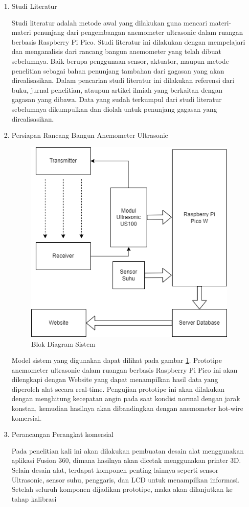 \begin{enumerate}
  \item Studi Literatur
  
  Studi literatur adalah metode awal yang dilakukan guna mencari materi-materi penunjang dari pengembangan anemometer ultrasonic 
  dalam ruangan berbasis Raspberry Pi Pico. Studi literatur ini dilakukan dengan mempelajari dan menganalisis dari rancang bangun 
  anemometer yang telah dibuat sebelumnya. Baik berupa penggunaan sensor, aktuator, maupun metode penelitian sebagai bahan penunjang 
  tambahan dari gagasan yang akan direalisasikan. Dalam pencarian studi literatur ini dilakukan referensi dari buku, jurnal penelitian, 
  ataupun artikel ilmiah yang berkaitan dengan gagasan yang dibawa. Data yang sudah terkumpul dari studi literatur sebelumnya dikumpulkan
  dan diolah untuk penunjang gagasan yang direalisasikan.

  \item Persiapan Rancang Bangun Anemometer Ultrasonic

  \begin{figure}[h!]
    \centering
    \includegraphics[width=0.4\linewidth]{"gambar/Blok diagram anemometer ultrasonic"}
    \caption{Blok Diagram Sistem}
    \label{fig:blok-diagram-anemometer-ultrasonic}
  \end{figure}

  Model sistem yang digunakan dapat dilihat pada  gambar \ref{fig:blok-diagram-anemometer-ultrasonic}. Prototipe anemometer ultrasonic dalam ruangan berbasis 
  Raspberry Pi Pico ini akan dilengkapi dengan Website yang dapat menampilkan hasil data yang diperoleh alat secara real-time. Pengujian prototipe ini akan dilakukan 
  dengan menghitung kecepatan angin pada saat kondisi normal dengan jarak konstan, kemudian hasilnya akan dibandingkan dengan anemometer hot-wire komersial. 

  \item Perancangan Perangkat komersial
  
  Pada penelitian kali ini akan dilakukan pembuatan desain alat menggunakan aplikasi Fusion 360, dimana hasilnya akan dicetak menggunakan printer 3D. Selain desain alat, terdapat komponen
  penting lainnya seperti sensor Ultrasonic, sensor suhu, penggaris, dan LCD untuk menampilkan informasi. Setelah seluruh komponen dijadikan prototipe, maka akan dilanjutkan ke tahap kalibrasi


\end{enumerate}
